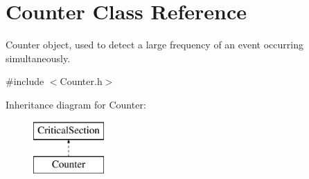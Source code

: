 \hypertarget{class_counter}{
\section{Counter Class Reference}
\label{class_counter}
}


Counter object, used to detect a large frequency of an event occurring simultaneously.  




{\ttfamily \#include $<$Counter.h$>$}

Inheritance diagram for Counter:\begin{figure}[H]
\begin{center}
\leavevmode
\includegraphics[height=2.000000cm]{class_counter}
\end{center}
\end{figure}
